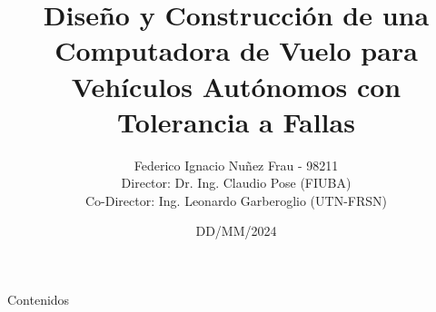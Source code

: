 \documentclass[10pt]{beamer}
\author[Federico Ignacio Nuñez Frau]{Federico Ignacio Nuñez Frau - 98211\\[1ex]  {\small Director: Dr. Ing. Claudio Pose (FIUBA)}\\ {\small Co-Director: Ing. Leonardo Garberoglio (UTN-FRSN)}}
\title[]{Diseño y Construcción de una Computadora de Vuelo para Vehículos Autónomos con Tolerancia a Fallas}
\date{DD/MM/2024}
\begin{document}
\begin{frame}
  \titlepage
\end{frame}

\begin{frame}{Contenidos}
  \tableofcontents
\end{frame}


















% 

% 

% 

% 

% 
\end{document}

